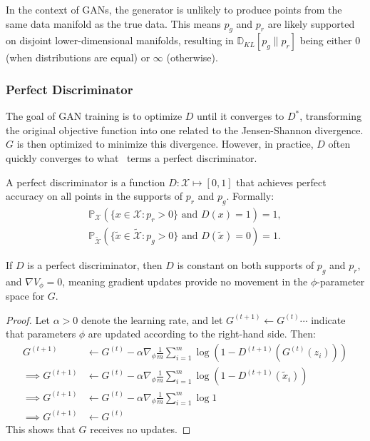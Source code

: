 In the context of GANs, the generator is unlikely to produce points from the same data manifold as the true data. This means $p_g$ and $p_r$ are likely supported on disjoint lower-dimensional manifolds, resulting in $\mathbb{D}_{KL}[p_g \| p_r]$ being either 0 (when distributions are equal) or $\infty$ (otherwise).

\subsubsection*{Perfect Discriminator}

The goal of GAN training is to optimize $D$ until it converges to $D^*$, transforming the original objective function into one related to the Jensen-Shannon divergence. $G$ is then optimized to minimize this divergence. However, in practice, $D$ often quickly converges to what~\cite{ref:arjovsky-towards-2017} terms a perfect discriminator.

\begin{definition}%
	\label{def:perfect-discriminator}
	A \textnormal{\sffamily perfect discriminator} is a function $D: \mathcal{X} \mapsto
		[0,1]$ that achieves perfect accuracy on all points in the supports of $p_r$ and $p_g$. Formally:
	\begin{align}
		\mathbb{P}_{\mathcal{X}}(\{x \in \mathcal{X} : p_r > 0\} \text{ and } D(x) = 1) = 1, \\
		\mathbb{P}_{\tilde{\mathcal{X}}}(\{\tilde{x} \in \tilde{\mathcal{X}} : p_g > 0\} \text{ and } D(\tilde{x}) = 0) = 1.
	\end{align}
\end{definition}

\begin{theorem}%
	\label{thm:perfect-discriminator}
	If $D$ is a perfect discriminator, then $D$ is constant on both supports of $p_g$ and $p_r$, and $\nabla V_\phi = 0$, meaning gradient updates provide no movement in the $\phi$-parameter space for $G$.
\end{theorem}

\begin{proof}%
	\label{prf:perfect-discriminator}
	Let $\alpha > 0$ denote the learning rate, and let $G^{(t+1)} \gets G^{(t)} \cdots$ indicate that parameters $\phi$ are updated according to the right-hand side. Then:
	\begin{align}
		\label{eq:g-updates-no-good}
		G^{(t+1)}          & \gets G^{(t)} - \alpha\nabla_\phi \frac{1}{m} \sum_{i=1}^m \log\left( 1 - D^{(t+1)}(G^{(t)}(z_i)) \right) \\
		\implies G^{(t+1)} & \gets G^{(t)} - \alpha\nabla_\phi \frac{1}{m} \sum_{i=1}^m \log\left( 1 - D^{(t+1)}(\tilde{x}_i) \right)  \\
		\implies G^{(t+1)} & \gets G^{(t)} - \alpha\nabla_\phi \frac{1}{m} \sum_{i=1}^m \log 1                                         \\
		\implies G^{(t+1)} & \gets G^{(t)}
	\end{align}
	This shows that $G$ receives no updates.
\end{proof}

